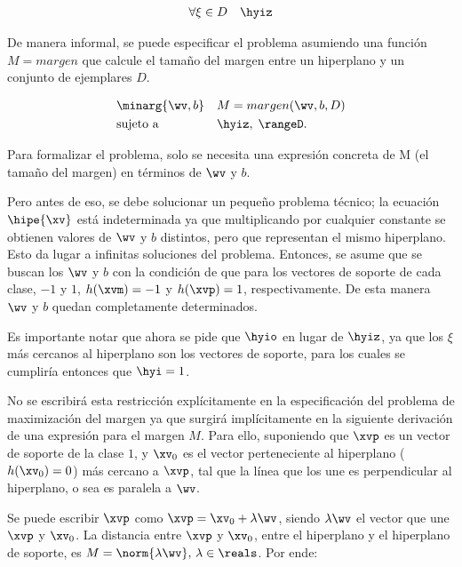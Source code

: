 \begin{align}
\forall \xi \in D \quad \hyiz
\end{align}

De manera informal, se puede especificar el problema asumiendo una función $M=margen$ que calcule el tamaño del margen entre un hiperplano y un conjunto de ejemplares $D$.

\begin{equation*}
\begin{aligned}
& \minarg{\wv,b}
& & M=margen(\wv,b,D) \\
& \text{sujeto a}
& & \hyiz, \; \rangeD.
\end{aligned}
\end{equation*}

Para formalizar el problema, solo se necesita una expresión concreta de M (el tamaño del margen) en términos de $\wv$ y $b$. 

Pero antes de eso, se debe solucionar un pequeño problema técnico; la ecuación $\hipe{\xv}$ está indeterminada ya que multiplicando por cualquier constante se obtienen valores de $\wv$ y $b$ distintos, pero que representan el mismo hiperplano. Esto da lugar a infinitas soluciones del problema. Entonces, se asume que se buscan los $\wv$ y $b$ con la condición de que para los vectores de soporte de cada clase, $-1$ y $1$, $h(\xvm) =-1$ y $h(\xvp) =1$, respectivamente. De esta manera $\wv$ y $b$ quedan completamente determinados. 

Es importante notar que ahora se pide que $\hyio$  en lugar de $\hyiz$, ya que los $\xi$ más cercanos al hiperplano son los vectores de soporte, para los cuales se cumpliría entonces que $\hyi =1$.

No se escribirá esta restricción explícitamente en la especificación del problema de maximización del margen ya que surgirá implícitamente en la siguiente derivación de una expresión para el margen $M$. Para ello, suponiendo que $\xvp$ es un vector de soporte de la clase $1$, y $\xv_0$ es el vector perteneciente al hiperplano ($h(\xv_0)=0$) más cercano a $\xvp$, tal que la línea que los une es perpendicular al hiperplano, o sea es paralela a $\wv$. 


Se puede escribir $\xvp$ como $\xvp = \xv_0 + \lambda \wv$, siendo $\lambda \wv$ el vector que une $\xvp$ y $\xv_0$. La distancia entre $\xvp$ y $\xv_0$, entre el hiperplano y el hiperplano de soporte, es $M=\norm{\lambda \wv}, \, \lambda \in \reals$. Por ende:

